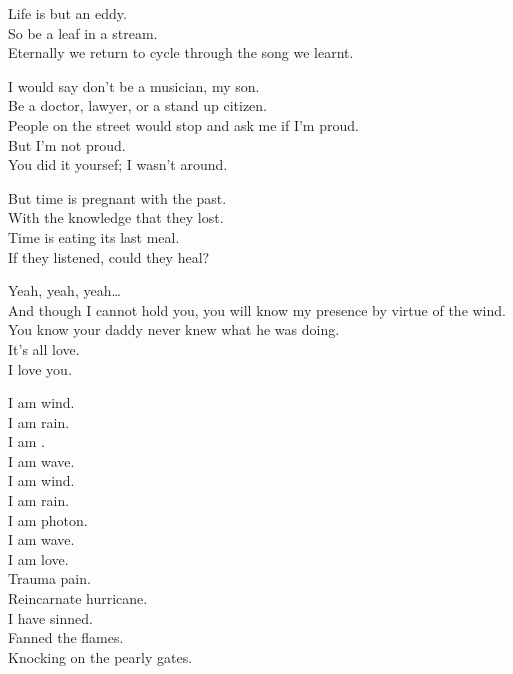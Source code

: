 
Life is but an eddy. \\
So be a leaf in a stream. \\
Eternally we return to cycle through the song we learnt. \\


I would say don't be a musician, my son. \\
Be a doctor, lawyer, or a stand up citizen. \\
People on the street would stop and ask me if I'm proud. \\
But I'm not proud. \\
You did it yoursef; I wasn't around. \\


But time is pregnant with the past. \\
With the knowledge that they lost. \\
Time is eating its last meal. \\
If they listened, could they heal? \\


Yeah, yeah, yeah… \\
And though I cannot hold you, you will know my presence by virtue of the wind. \\
You know your daddy never knew what he was doing. \\
It's all love. \\
I love you. \\


I am wind. \\
I am rain. \\
I am . \\
I am wave. \\
I am wind. \\
I am rain. \\
I am photon. \\
I am wave. \\
I am love. \\
Trauma pain. \\
Reincarnate hurricane. \\
I have sinned. \\
Fanned the flames. \\
Knocking on the pearly gates. \\


